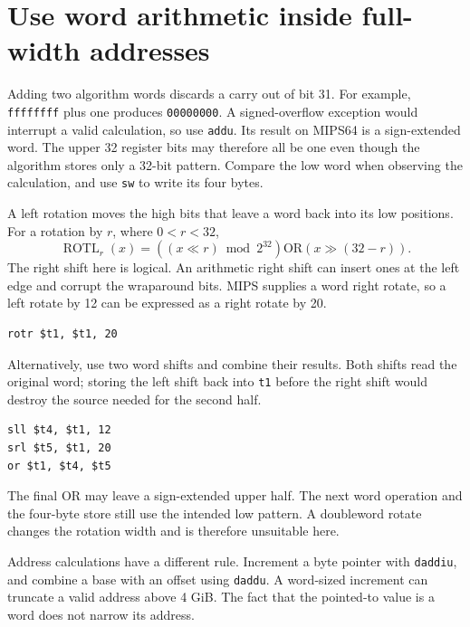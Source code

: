 \section{Use word arithmetic inside full-width addresses}
Adding two algorithm words discards a carry out of bit 31. For example,
\texttt{ffffffff} plus one produces \texttt{00000000}. A signed-overflow exception
would interrupt a valid calculation, so use \texttt{addu}. Its result on MIPS64 is a
sign-extended word. The upper 32 register bits may therefore all be one even though
the algorithm stores only a 32-bit pattern. Compare the low word when observing the
calculation, and use \texttt{sw} to write its four bytes.

A left rotation moves the high bits that leave a word back into its low positions.
For a rotation by \(r\), where \(0<r<32\),
\[
  \operatorname{ROTL}_r(x)=
  ((x\ll r)\bmod2^{32})\mathbin{\mathrm{OR}}(x\gg(32-r)).
\]
The right shift here is logical. An arithmetic right shift can insert ones at the
left edge and corrupt the wraparound bits. MIPS supplies a word right rotate, so a
left rotate by 12 can be expressed as a right rotate by 20.
\begin{verbatim}
rotr $t1, $t1, 20
\end{verbatim}

Alternatively, use two word shifts and combine their results. Both shifts read the
original word; storing the left shift back into \texttt{t1} before the right shift
would destroy the source needed for the second half.
\begin{verbatim}
sll $t4, $t1, 12
srl $t5, $t1, 20
or $t1, $t4, $t5
\end{verbatim}

The final OR may leave a sign-extended upper half. The next word operation and the
four-byte store still use the intended low pattern. A doubleword rotate changes the
rotation width and is therefore unsuitable here.

Address calculations have a different rule. Increment a byte pointer with
\texttt{daddiu}, and combine a base with an offset using \texttt{daddu}. A word-sized
increment can truncate a valid address above 4 GiB. The fact that the pointed-to value
is a word does not narrow its address.
